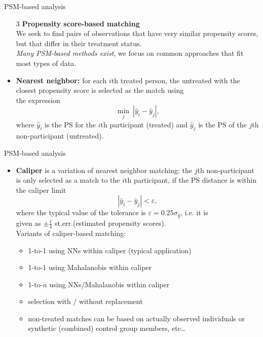 \documentclass{beamer}
\begin{document}
\begin{frame}{PSM-based analysis}
\begin{enumerate}
    \item[3] \textbf{Propensity score-based matching} \\ \smallskip We seek to find pairs of observations that have very similar propensity scores, but that differ in their treatment status. \\
    \smallskip
    \textit{Many PSM-based methods exist}, we focus on common approaches that fit most types of data.
\end{enumerate}
\begin{itemize}
    \item \textbf{Nearest neighbor:} for each $i$th treated person, the untreated with the closest propensity score is selected as the match using\\ the expression
    $$
    \underset{j}{\min}~|\hat{y}_i - \hat{y}_j|,
    $$
    where $\hat{y}_i$ is the PS for the $i$th participant (treated) and $\hat{y}_j$ is the PS of the $j$th non-participant (untreated). 
\end{itemize}
\end{frame}
\begin{frame}{PSM-based analysis}
\begin{itemize}
    \item \textbf{Caliper} is a variation of nearest neighbor matching: the $j$th non-participant is only selected as a match to the $i$th participant, if the PS distance is within the caliper limit 
    $$
    |\hat{y}_i - \hat{y}_j| < \varepsilon,
    $$
    where the typical value of the tolerance is $\varepsilon = 0.25 \sigma_{\hat{y}}$, i.e. it is \\given as $\pm \tfrac{1}{4}$ st.err.(estimated propensity scores).  \\ \medskip
    Variants of caliper-based matching: \\ \medskip
    \begin{itemize}
        \item 1-to-1 using NNs within caliper (typical application)
        \smallskip
        \item 1-to-1 using Mahalanobis within caliper
        \smallskip
        \item 1-to-$n$ using NNs/Mahalanobis within caliper
        \smallskip
        \item selection with / without replacement
        \item non-treated matches can be based on actually observed individuals or synthetic (combined) control group members, etc\dots
    \end{itemize}
\end{itemize}
\end{frame}
\end{document}
